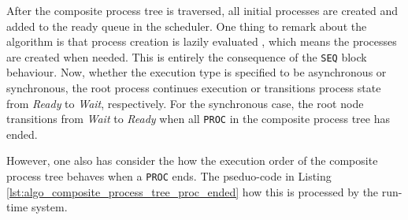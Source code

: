 After the composite process tree is traversed, all initial processes are created and added to the ready queue in the scheduler. One thing to remark about the algorithm is that process creation is lazily evaluated \citep{lazyevaluation}, which means the processes are created when needed. This is entirely the consequence of the \texttt{SEQ} block behaviour. 
Now, whether the execution type is specified to be asynchronous or synchronous, the root process continues execution or transitions process state from \textit{Ready} to \textit{Wait}, respectively. For the synchronous case, the root node transitions from \textit{Wait} to \textit{Ready} when all \texttt{PROC} in the composite process tree has ended. 

However, one also has consider the how the execution order of the composite process tree behaves when a \texttt{PROC} ends. The pseduo\hyp{}code in Listing \ref{lst:algo_composite_process_tree_proc_ended} how this is processed by the run\hyp{}time system.

